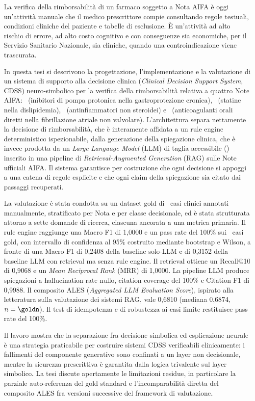La verifica della rimborsabilità di un farmaco soggetto a Nota AIFA è oggi un'attività manuale che il medico prescrittore compie consultando regole testuali, condizioni cliniche del paziente e tabelle di esclusione. È un'attività ad alto rischio di errore, ad alto costo cognitivo e con conseguenze sia economiche, per il Servizio Sanitario Nazionale, sia cliniche, quando una controindicazione viene trascurata.

In questa tesi si descrivono la progettazione, l'implementazione e la valutazione di un sistema di supporto alla decisione clinica (\emph{Clinical Decision Support System}, CDSS) neuro-simbolico per la verifica della rimborsabilità relativa a quattro Note AIFA: \notezero\ (inibitori di pompa protonica nella gastroprotezione cronica), \notetredici\ (statine nella dislipidemia), \notesessanta\ (antinfiammatori non steroidei) e \notenova\ (anticoagulanti orali diretti nella fibrillazione atriale non valvolare). L'architettura separa nettamente la decisione di rimborsabilità, che è interamente affidata a un rule engine deterministico ispezionabile, dalla generazione della spiegazione clinica, che è invece prodotta da un \emph{Large Language Model} (LLM) di taglia accessibile (\llmmodel) inserito in una pipeline di \emph{Retrieval-Augmented Generation} (RAG) sulle Note ufficiali AIFA. Il sistema garantisce per costruzione che ogni decisione si appoggi a una catena di regole esplicite e che ogni claim della spiegazione sia citato dai passaggi recuperati.

La valutazione è stata condotta su un dataset gold di \goldn\ casi clinici annotati manualmente, stratificato per Nota e per classe decisionale, ed è stata strutturata attorno a sette domande di ricerca, ciascuna ancorata a una metrica primaria. Il rule engine raggiunge una Macro F1 di 1{,}0000 e un pass rate del 100\% sui \goldn\ casi gold, con intervallo di confidenza al 95\% costruito mediante bootstrap e Wilson, a fronte di una Macro F1 di 0{,}2408 della baseline solo-LLM e di 0{,}3152 della baseline LLM con retrieval ma senza rule engine. Il retrieval ottiene un Recall@10 di 0{,}9068 e un \emph{Mean Reciprocal Rank} (MRR) di 1{,}0000. La pipeline LLM produce spiegazioni a hallucination rate nullo, citation coverage del 100\% e Citation F1 di 0{,}9988. Il composito ALES (\emph{Aggregated LLM Evaluation Score}), ispirato alla letteratura sulla valutazione dei sistemi RAG, vale 0{,}6810 (mediana 0{,}6874, $n=\goldn$). Il test di idempotenza e di robustezza ai casi limite restituisce pass rate del 100\%.

Il lavoro mostra che la separazione fra decisione simbolica ed esplicazione neurale è una strategia praticabile per costruire sistemi CDSS verificabili clinicamente: i fallimenti del componente generativo sono confinati a un layer non decisionale, mentre la sicurezza prescrittiva è garantita dalla logica trivalente sul layer simbolico. La tesi discute apertamente le limitazioni residue, in particolare la parziale auto-referenza del gold standard e l'incomparabilità diretta del composito ALES fra versioni successive del framework di valutazione.
